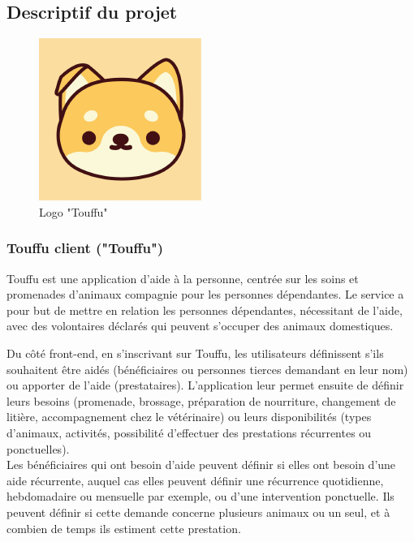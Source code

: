 \documentclass[conference]{IEEEtran}
\begin{document}
\subsection{Descriptif du projet}

\begin{figure}[h]
	\centering
	\includegraphics[width=0.4\columnwidth]{Ressources/Images/Touffu-logo-small.png}
	\caption{Logo "Touffu"}
	\label{fig:logosmall}
\end{figure}

\subsubsection{Touffu client ("Touffu")}\hfil

Touffu est une application d'aide à la personne, centrée sur les soins et promenades d’animaux compagnie pour les personnes dépendantes. Le service a pour but de mettre en relation les personnes dépendantes, nécessitant de l'aide, avec des volontaires déclarés qui peuvent s’occuper des animaux domestiques.

Du côté front-end, en s'inscrivant sur Touffu, les utilisateurs définissent s'ils souhaitent être aidés (bénéficiaires ou personnes tierces demandant en leur nom) ou apporter de l'aide (prestataires). L'application leur permet ensuite de définir leurs besoins (promenade, brossage, préparation de nourriture, changement de litière, accompagnement chez le vétérinaire) ou leurs disponibilités (types d'animaux, activités, possibilité d'effectuer des prestations récurrentes ou ponctuelles).\\

Les bénéficiaires qui ont besoin d'aide peuvent définir si elles ont besoin d'une aide récurrente, auquel cas elles peuvent définir une récurrence quotidienne, hebdomadaire ou mensuelle par exemple, ou d'une intervention ponctuelle. Ils peuvent définir si cette demande concerne plusieurs animaux ou un seul, et à combien de temps ils estiment cette prestation.
\end{document}
